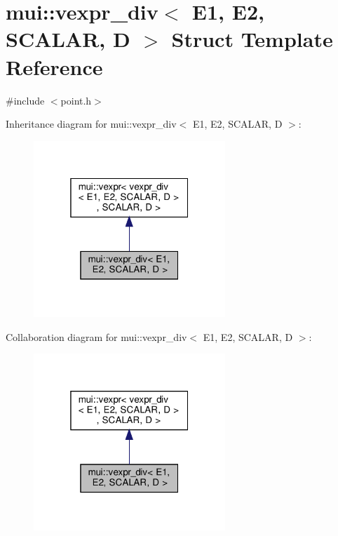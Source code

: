 \hypertarget{structmui_1_1vexpr__div}{}\section{mui\+:\+:vexpr\+\_\+div$<$ E1, E2, S\+C\+A\+L\+AR, D $>$ Struct Template Reference}
\label{structmui_1_1vexpr__div}


{\ttfamily \#include $<$point.\+h$>$}



Inheritance diagram for mui\+:\+:vexpr\+\_\+div$<$ E1, E2, S\+C\+A\+L\+AR, D $>$\+:
\nopagebreak
\begin{figure}[H]
\begin{center}
\leavevmode
\includegraphics[width=205pt]{structmui_1_1vexpr__div__inherit__graph}
\end{center}
\end{figure}


Collaboration diagram for mui\+:\+:vexpr\+\_\+div$<$ E1, E2, S\+C\+A\+L\+AR, D $>$\+:
\nopagebreak
\begin{figure}[H]
\begin{center}
\leavevmode
\includegraphics[width=205pt]{structmui_1_1vexpr__div__coll__graph}
\end{center}
\end{figure}
